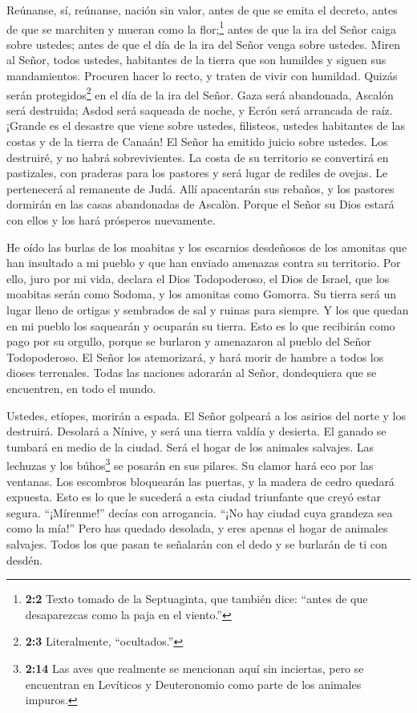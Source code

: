  Reúnanse, sí, reúnanse, nación sin valor, 
antes de que se emita el decreto, antes de que se marchiten y mueran
como la flor;\footnote{\textbf{2:2} Texto tomado de la Septuaginta, que
  también dice: ``antes de que desaparezcas como la paja en el viento.''}
antes de que la ira del Señor caiga sobre ustedes; antes de que el día
de la ira del Señor venga sobre ustedes.  Miren al Señor,
todos ustedes, habitantes de la tierra que son humildes y siguen sus
mandamientos. Procuren hacer lo recto, y traten de vivir con humildad.
Quizás serán protegidos\footnote{\textbf{2:3} Literalmente,
  ``ocultados.''} en el día de la ira del Señor.  Gaza será
abandonada, Ascalón será destruida; Asdod será saqueada de noche, y
Ecrón será arrancada de raíz.  ¡Grande es el desastre que
viene sobre ustedes, filisteos, ustedes habitantes de las costas y de la
tierra de Canaán! El Señor ha emitido juicio sobre ustedes. Los
destruiré, y no habrá sobrevivientes.  La costa de su
territorio se convertirá en pastizales, con praderas para los pastores y
será lugar de rediles de ovejas.  Le pertenecerá al
remanente de Judá. Allí apacentarán sus rebaños, y los pastores dormirán
en las casas abandonadas de Ascalòn. Porque el Señor su Dios estará con
ellos y los hará prósperos nuevamente.

 He oído las burlas de los moabitas y los escarnios
desdeñosos de los amonitas que han insultado a mi pueblo y que han
enviado amenazas contra su territorio.  Por ello, juro por
mi vida, declara el Dios Todopoderoso, el Dios de Israel, que los
moabitas serán como Sodoma, y los amonitas como Gomorra. Su tierra será
un lugar lleno de ortigas y sembrados de sal y ruinas para siempre. Y
los que quedan en mi pueblo los saquearán y ocuparán su tierra.
 Esto es lo que recibirán como pago por su orgullo, porque
se burlaron y amenazaron al pueblo del Señor Todopoderoso. 
El Señor los atemorizará, y hará morir de hambre a todos los dioses
terrenales. Todas las naciones adorarán al Señor, dondequiera que se
encuentren, en todo el mundo.

 Ustedes, etíopes, morirán a espada.  El Señor
golpeará a los asirios del norte y los destruirá. Desolará a Nínive, y
será una tierra valdía y desierta.  El ganado se tumbará en
medio de la ciudad. Será el hogar de los animales salvajes. Las lechuzas
y los búhos\footnote{\textbf{2:14} Las aves que realmente se mencionan
  aquí sin inciertas, pero se encuentran en Levíticos y Deuteronomio
  como parte de los animales impuros.} se posarán en sus pilares. Su
clamor hará eco por las ventanas. Los escombros bloquearán las puertas,
y la madera de cedro quedará expuesta.  Esto es lo que le
sucederá a esta ciudad triunfante que creyó estar segura. ``¡Mírenme!''
decías con arrogancia. ``¡No hay ciudad cuya grandeza sea como la mía!''
Pero has quedado desolada, y eres apenas el hogar de animales salvajes.
Todos los que pasan te señalarán con el dedo y se burlarán de ti con
desdén.

